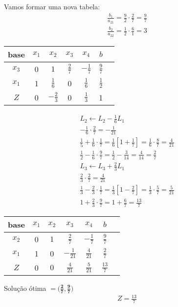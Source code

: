 \documentclass{article}
\begin{document}
Vamos formar uma nova tabela:
\begin{align*}
    \boxed{\frac{b_1}{a_21} = \frac{9}{2} \cdot \frac{2}{7} = \frac{9}{7}} \\
    \frac{b_2}{a_22} = \frac{1}{2} \cdot \frac{6}{1} = 3
\end{align*}

\begin{table}[h!]
    \centering
    \begin{tabular}{ c | c c c c | c c}
       base  & $x_1$ & $x_2$ & $x_3$ & $x_4$ & $b$ \\
       \hline
        $x_3$ & 0 & $1$ & $\frac{2}{7}$ & $-\frac{1}{7}$ & $\frac{9}{7}$ \\
         $x_1$ & 1 & $\frac{1}{6}$ & 0 & $\frac{1}{6}$ & $\frac{1}{2}$ \\
        \hline
        $Z$ & 0 & $-\frac{2}{3}$ & 0 & $\frac{1}{3}$ & 1 \\
    \end{tabular}
\end{table}
\begin{align*}
    L_2 \leftarrow L_2 - \frac{1}{6}L_1 \\
    -\frac{1}{6} \cdot \frac{2}{7} = - \frac{1}{21} \\
    \frac{1}{5} + \frac{1}{6} \cdot \frac{1}{7} = \frac{1}{6}[1+\frac{1}{7}] = \frac{1}{6} \cdot \frac{8}{7} = \frac{4}{21} \\
    \frac{1}{2} - \frac{1}{6} \cdot \frac{9}{7} = \frac{1}{2} - \frac{3}{14} = \frac{4}{14} = \frac{2}{7} \\
    L_3 \leftarrow L_3 + \frac{2}{3}L_1 \\
    \frac{2}{3} \cdot \frac{2}{7} = \frac{4}{21} \\
    \frac{1}{3} - \frac{2}{3} \cdot \frac{1}{7} = \frac{1}{3}[1-\frac{2}{7}] = \frac{1}{3} \cdot \frac{5}{7} = \frac{5}{21} \\
    1+\frac{2}{3} \cdot \frac{9}{7} = 1 + \frac{6}{7} = \frac{13}{7}
\end{align*}
\begin{table}[h!]
    \centering
    \begin{tabular}{ c | c c c c | c c}
       base  & $x_1$ & $x_2$ & $x_3$ & $x_4$ & $b$ \\
       \hline
        $x_2$ & 0 & $1$ & $\frac{2}{7}$ & $-\frac{1}{7}$ & $\frac{9}{7}$ \\
         $x_1$ & 1 & 0 & $-\frac{1}{21}$ & $\frac{4}{21}$ & $\frac{2}{7}$ \\
        \hline
        $Z$ & 0 & $0$ & $\frac{4}{21}$ & $\frac{5}{21}$ & $\frac{13}{7}$ \\
    \end{tabular}
\end{table}

Solução ótima $\mathbf{= (\frac{2}{7}, \frac{9}{7}})$
\begin{align*}
    \boxed{Z = \frac{13}{7}}
\end{align*}
\end{document}
